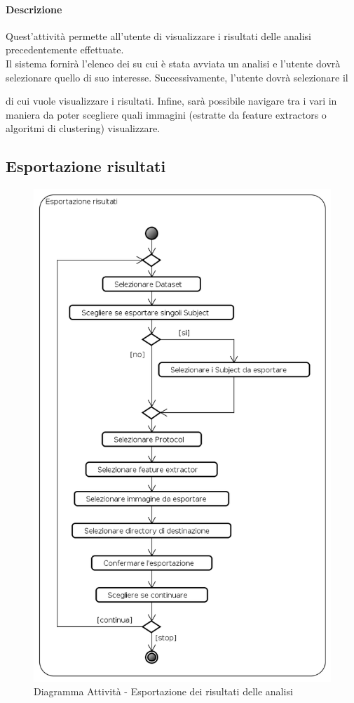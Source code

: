 \paragraph{Descrizione\\}
Quest'attività permette all'utente di visualizzare i risultati delle analisi precedentemente effettuate.
\\Il sistema fornirà l'elenco dei \dataset{} su cui è stata avviata un analisi e l'utente dovrà selezionare quello di suo interesse. Successivamente, l'utente dovrà selezionare il \subject{} di cui vuole visualizzare i risultati. Infine, sarà possibile navigare tra i vari \protocol{} in maniera da poter scegliere quali immagini (estratte da feature extractors\glossario{} o algoritmi di clustering) visualizzare. 
\pagebreak

\subsection{Esportazione risultati}
\label{seeAnalysis}
\begin{figure}[!h]
	\centering
	\includegraphics[scale=0.6]{./img/Diagrammi_Attivita/Esportazione_risultati}
	\caption{Diagramma Attività - Esportazione dei risultati delle analisi}
	\label{espAnalysis}
\end{figure}
